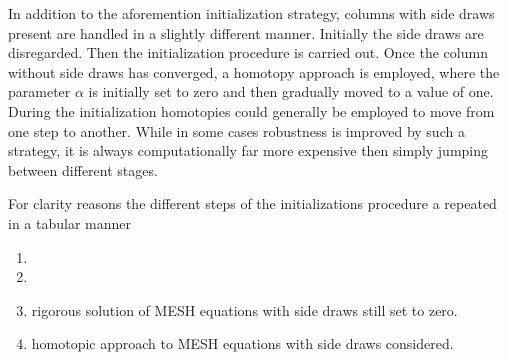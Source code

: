         In addition to the aforemention initialization strategy, columns with side draws present are handled
        in a slightly different manner. Initially the side draws are disregarded. Then the initialization procedure
        is carried out. Once the column without side draws has converged, a homotopy approach
        is employed, where the parameter $\alpha$ is initially set to zero and then gradually moved to a value
        of one. During the initialization homotopies could
        generally be employed to move from one step to another. While in some cases robustness is improved by
        such a strategy, it is always computationally far more expensive then simply jumping between different
        stages.

        For clarity reasons the different steps of the initializations procedure a repeated in a tabular manner

        \begin{enumerate}
            \item {}
            \item {}
            \item rigorous solution of MESH equations with side draws still set to zero.
            \item homotopic approach to MESH equations with side draws considered.
        \end{enumerate}

